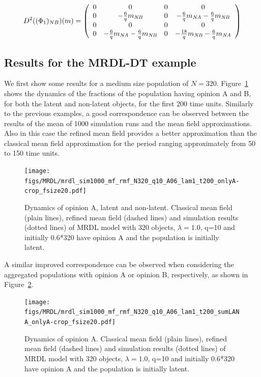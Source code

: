 \documentclass[review]{elsarticle}
\begin{document}
  $$D^2((\Phi_1)_{NB})(m)
= \left(
    \begin{array}{cccc}
      0 &  0& 0 & 0  \\
      0 & -\frac{6}{q}m_{\mathit{NB}} & 0 & -\frac{6}{q}m_{\mathit{NA}}-\frac{6}{q}m_{\mathit{NB}} \\
      0 & 0 & 0 & 0 \\
      0 & -\frac{6}{q}m_{\mathit{NA}}-\frac{6}{q}m_{\mathit{NB}} & 0 & -\frac{18}{q}m_{\mathit{NB}}-\frac{6}{q}m_{\mathit{NA}} \\
    \end{array}
  \right)$$
  
\subsection{Results for the MRDL-DT example}


We first show some results for a medium size population of $N=320$. Figure~\ref{fig:mrdl_06_320} shows the dynamics of the fractions of the population having opinion A and B, for both the latent and non-latent objects,
for the first $200$ time units. Similarly to the previous examples, a good correspondence can be observed between the results of the mean of 1000 simulation runs and the mean field approximations. Also in this case the refined mean field provides a better approximation than the classical mean field approximation for the period ranging approximately from 50 to 150 time units. 



\begin{figure}
\begin{center}
\texttt{[image: figs/MRDL/mrdl\_sim1000\_mf\_rmf\_N320\_q10\_A06\_lam1\_t200\_onlyA-crop\_fsize20.pdf]}
\end{center}
\caption{\label{fig:mrdl_06_320} Dynamics of opinion A, latent and non-latent. Classical mean field (plain lines),  refined mean field (dashed lines) and simulation results (dotted lines) of MRDL model with 320 objects, $\lambda=1.0$, q=10 and initially 0.6*320 have opinion A and the population is initially latent. }
\end{figure}

A similar improved correspondence can be observed when considering the
aggregated populations with opinion A or opinion B, respectively, as
shown in Figure~\ref{fig:mrdl_06_320_sum}.

\begin{figure}
\begin{center}
\texttt{[image: figs/MRDL/mrdl\_sim1000\_mf\_rmf\_N320\_q10\_A06\_lam1\_t200\_sumLANA\_onlyA-crop\_fsize20.pdf]}
\end{center}
\caption{\label{fig:mrdl_06_320_sum} Dynamics of opinion A. Classical mean field (plain lines),  refined mean field (dashed lines) and simulation results (dotted lines) of MRDL model with 320 objects, $\lambda=1.0$, q=10 and initially 0.6*320 have opinion A and the population is initially latent. }
\end{figure}
\end{document}
